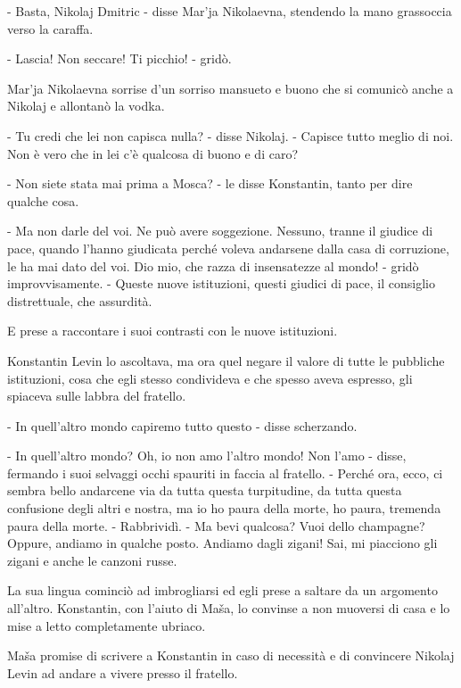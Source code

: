- Basta, Nikolaj Dmitric - disse Mar'ja Nikolaevna, stendendo la mano grassoccia verso la caraffa. 

- Lascia! Non seccare! Ti picchio! - gridò. 

Mar'ja Nikolaevna sorrise d'un sorriso mansueto e buono che si comunicò anche a Nikolaj e allontanò la vodka. 

- Tu credi che lei non capisca nulla? - disse Nikolaj. - Capisce tutto meglio di noi. Non è vero che in lei c'è qualcosa di buono e di caro? 

- Non siete stata mai prima a Mosca? - le disse Konstantin, tanto per dire qualche cosa. 

- Ma non darle del voi. Ne può avere soggezione. Nessuno, tranne il giudice di pace, quando l'hanno giudicata perché voleva andarsene dalla casa di corruzione, le ha mai dato del voi. Dio mio, che razza di insensatezze al mondo! - gridò improvvisamente. - Queste nuove istituzioni, questi giudici di pace, il consiglio distrettuale, che assurdità. 

E prese a raccontare i suoi contrasti con le nuove istituzioni. 

Konstantin Levin lo ascoltava, ma ora quel negare il valore di tutte le pubbliche istituzioni, cosa che egli stesso condivideva e che spesso aveva espresso, gli spiaceva sulle labbra del fratello. 

- In quell'altro mondo capiremo tutto questo - disse scherzando. 

- In quell'altro mondo? Oh, io non amo l'altro mondo! Non l'amo - disse, fermando i suoi selvaggi occhi spauriti in faccia al fratello. - Perché ora, ecco, ci sembra bello andarcene via da tutta questa turpitudine, da tutta questa confusione degli altri e nostra, ma io ho paura della morte, ho paura, tremenda paura della morte. - Rabbrividì. - Ma bevi qualcosa? Vuoi dello champagne? Oppure, andiamo in qualche posto. Andiamo dagli zigani! Sai, mi piacciono gli zigani e anche le canzoni russe. 

La sua lingua cominciò ad imbrogliarsi ed egli prese a saltare da un argomento all'altro. Konstantin, con l'aiuto di Maša, lo convinse a non muoversi di casa e lo mise a letto completamente ubriaco. 

Maša promise di scrivere a Konstantin in caso di necessità e di convincere Nikolaj Levin ad andare a vivere presso il fratello. 

